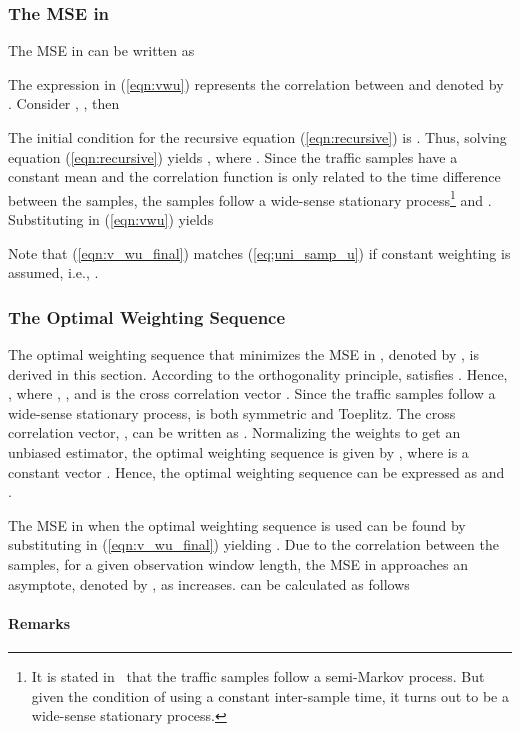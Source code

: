 \documentclass[11pt,draftclsnofoot,journal,onecolumn]{IEEEtran}
\begin{document}
\subsubsection{The MSE in }
\label{sec:mse_u_weight}

The MSE in  can be written as

The expression  in (\ref{eqn:vwu}) represents the correlation between  and  denoted by . Consider , , then

The initial condition for the recursive equation (\ref{eqn:recursive}) is . Thus, solving equation (\ref{eqn:recursive}) yields , where . Since the traffic samples have a constant mean and the correlation function is only related to the time difference between the samples, the samples follow a wide-sense stationary process\footnote{It is stated in~\cite{kim_tmc_2008} that the traffic samples follow a semi-Markov process. But given the condition of using a constant inter-sample time, it turns out to be a wide-sense stationary process.} and . Substituting  in (\ref{eqn:vwu}) yields

Note that (\ref{eqn:v_wu_final}) matches (\ref{eq;uni_samp_u}) if constant weighting is assumed, i.e., .

\subsubsection{The Optimal Weighting Sequence}
\label{sec:opt_weight_seq}

The optimal weighting sequence that minimizes the MSE in , denoted by , is derived in this section. According to the orthogonality principle,  satisfies . Hence, , where , , and  is the cross correlation vector . Since the traffic samples follow a wide-sense stationary process,  is both symmetric and Toeplitz. The cross correlation vector, , can be written as . Normalizing the weights to get an unbiased estimator, the optimal weighting sequence is given by , where  is a constant vector . Hence, the optimal weighting sequence can be expressed as  and .

The MSE in  when the optimal weighting sequence is used can be found by substituting  in (\ref{eqn:v_wu_final}) yielding . Due to the correlation between the samples, for a given observation window length, the MSE in  approaches an asymptote, denoted by , as  increases.  can be calculated as follows

\paragraph*{Remarks}
\end{document}
